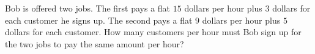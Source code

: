 Bob is offered two jobs. The first pays a flat $15$ dollars per hour plus $3$ dollars for each customer he signs up. The second pays a flat $9$ dollars per hour plus $5$ dollars for each customer. How many customers per hour must Bob sign up for the two jobs to pay the same amount per hour?
